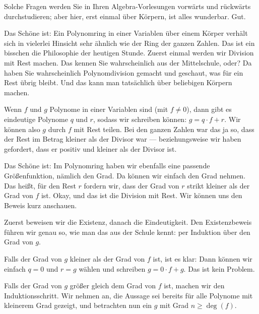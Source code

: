 \begin{spoken-clean}[00:18:00 - 00:22:50]
Solche Fragen werden Sie in Ihren Algebra-Vorlesungen vorwärts und rückwärts durchstudieren; aber hier, erst einmal über Körpern, ist alles wunderbar. Gut. 

Das Schöne ist: Ein Polynomring in einer Variablen über einem Körper verhält sich in vielerlei Hinsicht sehr ähnlich wie der Ring der ganzen Zahlen. Das ist ein bisschen die Philosophie der heutigen Stunde. Zuerst einmal werden wir Division mit Rest machen. Das kennen Sie wahrscheinlich aus der Mittelschule, oder? Da haben Sie wahrscheinlich Polynomdivision gemacht und geschaut, was für ein Rest übrig bleibt. Und das kann man tatsächlich über beliebigen Körpern machen. 

Wenn $f$ und $g$ Polynome in einer Variablen sind (mit $f \neq 0$), dann gibt es eindeutige Polynome $q$ und $r$, sodass wir schreiben können: $g = q \cdot f + r$. Wir können also $g$ durch $f$ mit Rest teilen. Bei den ganzen Zahlen war das ja so, dass der Rest im Betrag kleiner als der Divisor war --- beziehungsweise wir haben gefordert, dass er positiv und kleiner als der Divisor ist. 

Das Schöne ist: Im Polynomring haben wir ebenfalls eine passende Größenfunktion, nämlich den Grad. Da können wir einfach den Grad nehmen. Das heißt, für den Rest $r$ fordern wir, dass der Grad von $r$ strikt kleiner als der Grad von $f$ ist. Okay, und das ist die Division mit Rest. Wir können uns den Beweis kurz anschauen.
\end{spoken-clean}

\begin{math-stroke}
\end{math-stroke}

\begin{spoken-clean}[00:22:50 - 00:24:30]
Zuerst beweisen wir die Existenz, danach die Eindeutigkeit. Den Existenzbeweis führen wir genau so, wie man das aus der Schule kennt: per Induktion über den Grad von $g$. 

Falls der Grad von $g$ kleiner als der Grad von $f$ ist, ist es klar: Dann können wir einfach $q = 0$ und $r = g$ wählen und schreiben $g = 0 \cdot f + g$. Das ist kein Problem. 

Falls der Grad von $g$ größer gleich dem Grad von $f$ ist, machen wir den Induktionsschritt. Wir nehmen an, die Aussage sei bereits für alle Polynome mit kleinerem Grad gezeigt, und betrachten nun ein $g$ mit Grad $n \ge \deg(f)$.
\end{spoken-clean}

